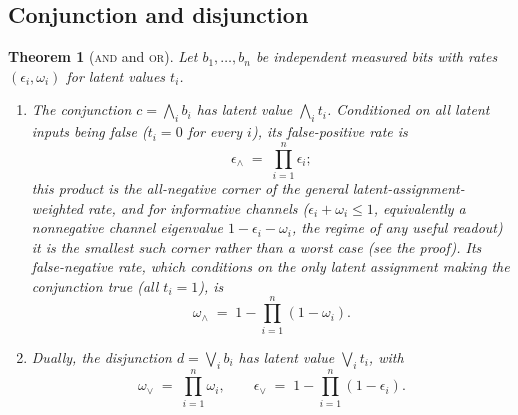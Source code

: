 \documentclass[12pt]{article}
\numberwithin{equation}{section}
\theoremstyle{plain}
\newtheorem{theorem}{Theorem}[section]
\theoremstyle{definition}
\theoremstyle{remark}
\newcommand{\eps}{\epsilon}
\begin{document}
\subsection{Conjunction and disjunction}

\begin{theorem}[\textsc{and} and \textsc{or}]
\label{thm:andor}
Let $b_1,\dots,b_n$ be independent measured bits with rates
$(\eps_i,\omega_i)$ for latent values $t_i$.
\begin{enumerate}[label=(\roman*),leftmargin=2em]
  \item The conjunction $c=\bigwedge_i b_i$ has latent value $\bigwedge_i t_i$.
        Conditioned on all latent inputs being false ($t_i=0$ for every $i$), its
        false-positive rate is
        \begin{equation}
        \label{eq:and-fpr}
          \eps_{\wedge} \;=\; \prod_{i=1}^{n} \eps_i ;
        \end{equation}
        this product is the all-negative corner of the general
        latent-assignment-weighted rate, and for informative channels
        ($\eps_i+\omega_i\le1$, equivalently a nonnegative channel eigenvalue
        $1-\eps_i-\omega_i$, the regime of any useful readout) it is the
        smallest such corner rather than a worst case (see the proof). Its false-negative rate, which conditions on
        the only latent assignment making the conjunction true (all $t_i=1$), is
        \begin{equation}
        \label{eq:and-fnr}
          \omega_{\wedge} \;=\; 1 - \prod_{i=1}^{n}(1-\omega_i).
        \end{equation}
  \item Dually, the disjunction $d=\bigvee_i b_i$ has latent value
        $\bigvee_i t_i$, with
        \begin{equation}
        \label{eq:or}
          \omega_{\vee} \;=\; \prod_{i=1}^{n}\omega_i,
          \qquad
          \eps_{\vee} \;=\; 1 - \prod_{i=1}^{n}(1-\eps_i).
        \end{equation}
\end{enumerate}
\end{theorem}
\end{document}
